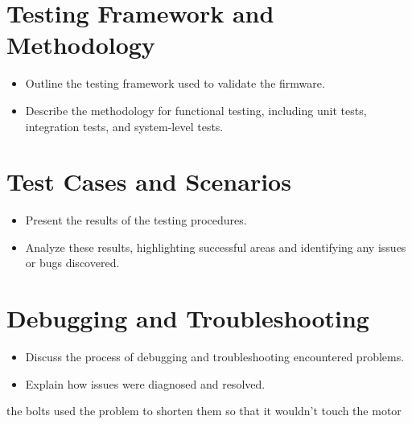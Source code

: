 \section{Testing Framework and Methodology}
\begin{itemize}
	\item Outline the testing framework used to validate the firmware.
	\item Describe the methodology for functional testing, including unit tests, integration tests, and system-level tests.
\end{itemize}
\section{Test Cases and Scenarios}
\begin{itemize}
	\item Present the results of the testing procedures.
	\item Analyze these results, highlighting successful areas and identifying any issues or bugs discovered.
\end{itemize}
\section{Debugging and Troubleshooting}
\begin{itemize}
	\item Discuss the process of debugging and troubleshooting encountered problems.
	\item Explain how issues were diagnosed and resolved.
\end{itemize}

\begin{notebox}
	the bolts used the problem to shorten them so that it wouldn't touch the motor 
\end{notebox}

